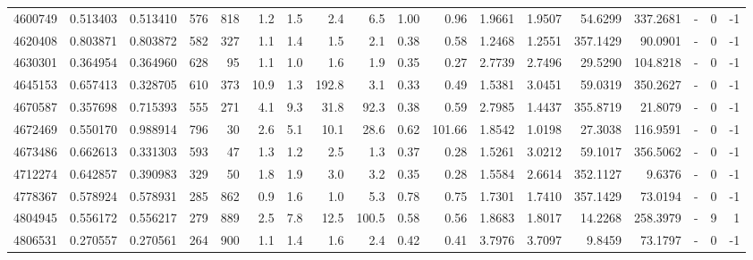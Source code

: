 \begin{tabular}{rrrrrrrrrrrrrrrlrr}
   4600749 & 0.513403 &   0.513410 &  576 &  818 &      1.2 &      1.5 &     2.4 &      6.5 &       1.00 &        0.96 &  1.9661 &  1.9507 &   54.6299 &  337.2681 &             - &        0 &         -1 \\
   4620408 & 0.803871 &   0.803872 &  582 &  327 &      1.1 &      1.4 &     1.5 &      2.1 &       0.38 &        0.58 &  1.2468 &  1.2551 &  357.1429 &   90.0901 &             - &        0 &         -1 \\
   4630301 & 0.364954 &   0.364960 &  628 &   95 &      1.1 &      1.0 &     1.6 &      1.9 &       0.35 &        0.27 &  2.7739 &  2.7496 &   29.5290 &  104.8218 &             - &        0 &         -1 \\
   4645153 & 0.657413 &   0.328705 &  610 &  373 &     10.9 &      1.3 &   192.8 &      3.1 &       0.33 &        0.49 &  1.5381 &  3.0451 &   59.0319 &  350.2627 &             - &        0 &         -1 \\
   4670587 & 0.357698 &   0.715393 &  555 &  271 &      4.1 &      9.3 &    31.8 &     92.3 &       0.38 &        0.59 &  2.7985 &  1.4437 &  355.8719 &   21.8079 &             - &        0 &         -1 \\
   4672469 & 0.550170 &   0.988914 &  796 &   30 &      2.6 &      5.1 &    10.1 &     28.6 &       0.62 &      101.66 &  1.8542 &  1.0198 &   27.3038 &  116.9591 &             - &        0 &         -1 \\
   4673486 & 0.662613 &   0.331303 &  593 &   47 &      1.3 &      1.2 &     2.5 &      1.3 &       0.37 &        0.28 &  1.5261 &  3.0212 &   59.1017 &  356.5062 &             - &        0 &         -1 \\
   4712274 & 0.642857 &   0.390983 &  329 &   50 &      1.8 &      1.9 &     3.0 &      3.2 &       0.35 &        0.28 &  1.5584 &  2.6614 &  352.1127 &    9.6376 &             - &        0 &         -1 \\
   4778367 & 0.578924 &   0.578931 &  285 &  862 &      0.9 &      1.6 &     1.0 &      5.3 &       0.78 &        0.75 &  1.7301 &  1.7410 &  357.1429 &   73.0194 &             - &        0 &         -1 \\
   4804945 & 0.556172 &   0.556217 &  279 &  889 &      2.5 &      7.8 &    12.5 &    100.5 &       0.58 &        0.56 &  1.8683 &  1.8017 &   14.2268 &  258.3979 &             - &        9 &          1 \\
   4806531 & 0.270557 &   0.270561 &  264 &  900 &      1.1 &      1.4 &     1.6 &      2.4 &       0.42 &        0.41 &  3.7976 &  3.7097 &    9.8459 &   73.1797 &             - &        0 &         -1 \\

\end{tabular}
